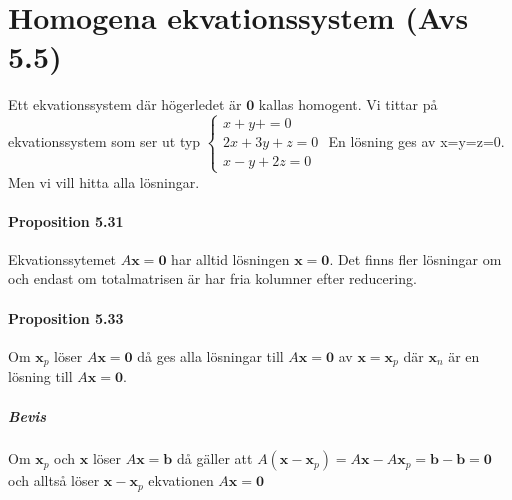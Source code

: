 \section{Homogena ekvationssystem (Avs 5.5)}
Ett ekvationssystem där högerledet är $\bm{0}$ kallas homogent.
Vi tittar på ekvationssystem som ser ut typ $\begin{cases}
    x+y+=0\\
    2x+3y+z=0\\
    x-y+2z=0
\end{cases}$
En lösning ges av x=y=z=0. 
Men vi vill hitta alla lösningar.

\paragraph{Proposition 5.31} Ekvationssytemet $A\bm{x}=\bm{0}$ har alltid lösningen $\bm{x}=\bm{0}$.
Det finns fler lösningar om och endast om totalmatrisen är har fria kolumner efter reducering.

\paragraph{Proposition 5.33} Om $\bm{x}_{p}$ löser $A\bm{x}=\bm{0}$ då ges alla lösningar till $A\bm{x}=\bm{0}$ av $\bm{x}=\bm{x}_{p}$
där $\bm{x}_{n}$ är en lösning till $A\bm{x}=\bm{0}$.
\subparagraph{Bevis} Om $\bm{x}_{p}$ och $\bm{x}$ löser $A\bm{x}=\bm{b}$ då gäller att $A(\bm{x}-\bm{x}_{p})=A\bm{x}-A\bm{x}_{p}=\bm{b}-\bm{b}=\bm{0}$
och alltså löser $\bm{x}-\bm{x}_{p}$ ekvationen $A\bm{x}=\bm{0}$

